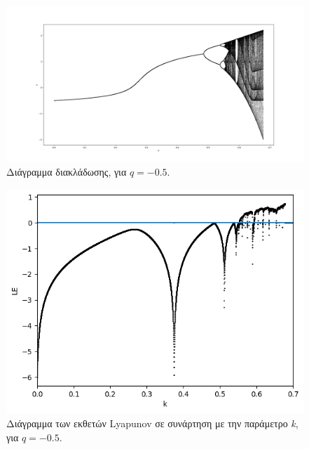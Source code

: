 \begin{figure}[h!]
	\centering
	\includegraphics[width=0.8\linewidth]{LateX images/graphs q05/g1}
	\caption{ Διάγραμμα διακλάδωσης, για $q=-0.5$.}
	\label{f:g10}
\end{figure}

\begin{figure}[h!]
	\centering
	\includegraphics[width=0.6\linewidth]{LateX images/graphs q05/g2}
	\caption{ Διάγραμμα των εκθετών Lyapunov σε συνάρτηση με την παράμετρο \emph{k}, για $q=-0.5$.}
	\label{f:g11}
\end{figure}

